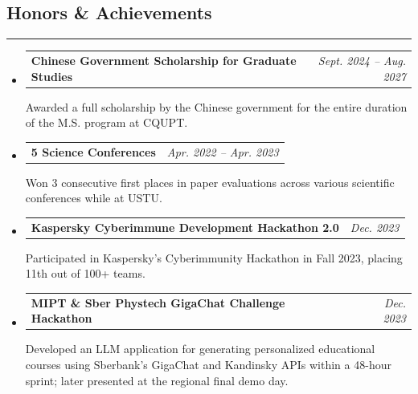 \documentclass[11pt,letterpaper]{article}
\makeatletter
\newcommand{\headerrow}[2]
{\begin{tabular*}{\linewidth}{l@{\extracolsep{\fill}}r}
#1 & #2 \\
\end{tabular*}}
\makeatother
\begin{document}
\vspace{0.2cm}

\subsection*{\Large Honors \& Achievements}
\vspace{-0.5em}
\hrule
\vspace{0.3em}

\begin{itemize}[leftmargin=0em, itemsep=0.4em]
    \parskip=0.1em
    \renewcommand\labelitemi{}

    \item
    \headerrow
        {\textbf{Chinese Government Scholarship for Graduate Studies}}
        {\emph{Sept. 2024 -- Aug. 2027}}
    Awarded a full scholarship by the Chinese government for the entire duration of the M.S. program at CQUPT.

    \item
    \headerrow
        {\textbf{5 Science Conferences}}
        {\emph{Apr. 2022 -- Apr. 2023}}
    Won 3 consecutive first places in paper evaluations across various scientific conferences while at USTU.

    \item
    \headerrow
        {\textbf{Kaspersky Cyberimmune Development Hackathon 2.0}}
        {\emph{Dec. 2023}}
    Participated in Kaspersky's Cyberimmunity Hackathon in Fall 2023, placing 11th out of 100+ teams.

    \item
    \headerrow
        {\textbf{MIPT \& Sber Phystech GigaChat Challenge Hackathon}}
        {\emph{Dec. 2023}}
    Developed an LLM application for generating personalized educational courses using Sberbank's GigaChat and Kandinsky APIs within a 48-hour sprint; later presented at the regional final demo day.

\end{itemize}
\end{document}
